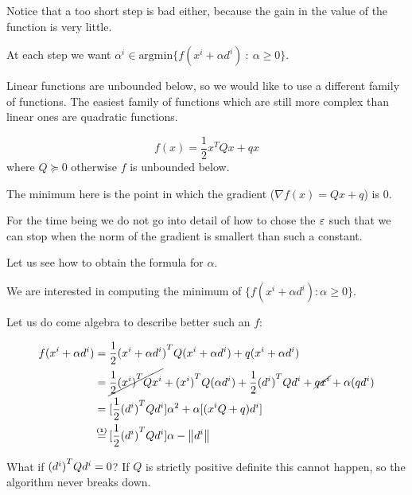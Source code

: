 \documentclass[ComputationalMathematics.tex]{subfiles}
\begin{document}
Notice that a too short step is bad either, because the gain in the value of the function is very little.

At each step we want $\alpha^i \in \mbox{argmin} \{f(x^i + \alpha d^i)~:~\alpha \geq 0\}$.

Linear functions are unbounded below, so we would like to use a different family of functions. The easiest family of functions which are still more complex than linear ones are quadratic functions.

\[
  f(x) = \frac{1}{2} x^T Q x + q x
\]
where $Q \succeq 0$ otherwise $f$ is unbounded below.

The minimum here is the point in which the gradient ($\nabla f(x) = Qx + q$) is $0$.


For the time being we do not go into detail of how to chose the $\varepsilon$ such that we can stop when the norm of the gradient is smallert than such a constant.

Let us see how to obtain the formula for $\alpha$.

We are interested in computing the minimum of $\{ f(x^i + \alpha d^i) : \alpha \ge 0\}$.

Let us do come algebra to describe better such an $f$:

\begin{equation}
  \begin{split}
    f(x^i + \alpha d^i) &= \frac{1}{2} \tr{(x^i + \alpha d^i)} Q (x^i + \alpha d^i) + q (x^i + \alpha d^i)\\
    &= \cancel{\frac{1}{2} \tr{(x^i)}Q x^i}  + \tr{(x^i)} Q (\alpha d^i) + \frac{1}{2} \tr{(d^i)} Q d^i + \cancel{q x^i} + \alpha (q d^i)\\
    &= [\frac{1}{2} \tr{(d^i)} Q d^i] \alpha^2  + \alpha [(x^i Q + q) d^i]\\
    &\numeq{(1)} [\frac{1}{2} \tr{(d^i)} Q d^i] \alpha  - \norm{d^i}\\
  \end{split}
\end{equation}

What if ${(d^i)}^{T} Q d^i = 0$? If $Q$ is strictly positive definite this cannot happen, so the algorithm never breaks down.
\end{document}
